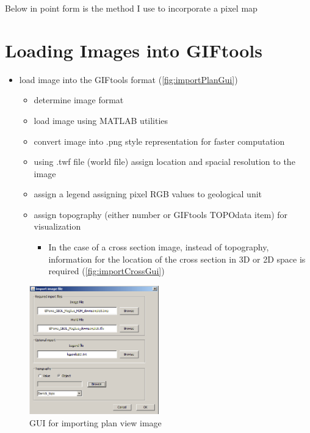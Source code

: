 Below in point form is the method I use to incorporate a pixel map

\section{Loading Images into GIFtools}
\label{sec:Load Images into GIFtools}

\begin{itemize}
\item load image into the GIFtools format (\autoref{fig:importPlanGui})
\begin{itemize}
	\item determine image format
	\item load image using MATLAB utilities
	\item convert image into .png style representation for faster computation
	\item using .twf file (world file) assign location and spacial resolution to the image
	\item assign a legend assigning pixel RGB values to geological unit
	\item assign topography (either number or GIFtools TOPOdata item) for visualization
	\begin{itemize}
		\item In the case of a cross section image, instead of topography, information for the location of the cross section in 3D or 2D space is required (\autoref{fig:importCrossGui})
	\end{itemize}
\end{itemize}
\end{itemize}
\begin{figure} [h]
    \centering
    \includegraphics[width=0.5\textwidth]{images/GUI/importPlan.PNG}
    \caption{GUI for importing plan view image }
    \label{fig:importPlanGui}
\end{figure}
